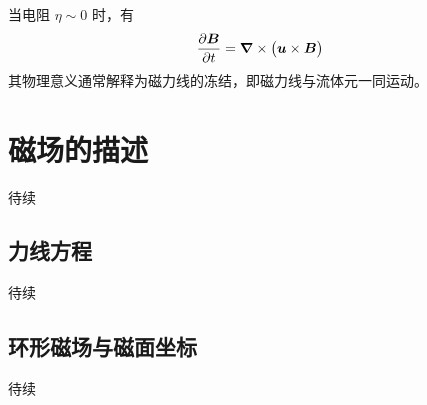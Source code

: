 当电阻 $\eta \sim 0$ 时，有
\begin{equation}
    \pdv{\bm{B}}{t} = \bm{\nabla} \times{\big( \bm{u} \times \bm{B} \big)}
\end{equation}
其物理意义通常解释为磁力线的冻结，即磁力线与流体元一同运动。

\section{磁场的描述}

待续

\subsection{力线方程}

待续

\subsection{环形磁场与磁面坐标}

待续
